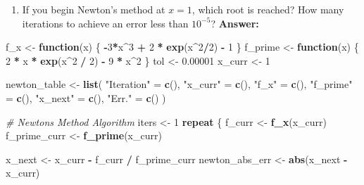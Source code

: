 \documentclass[
]{article}
\newenvironment{Shaded}{\begin{snugshade}}{\end{snugshade}}
\newcommand{\CommentTok}[1]{\textcolor[rgb]{0.56,0.35,0.01}{\textit{#1}}}
\newcommand{\ControlFlowTok}[1]{\textcolor[rgb]{0.13,0.29,0.53}{\textbf{#1}}}
\newcommand{\DecValTok}[1]{\textcolor[rgb]{0.00,0.00,0.81}{#1}}
\newcommand{\FloatTok}[1]{\textcolor[rgb]{0.00,0.00,0.81}{#1}}
\newcommand{\FunctionTok}[1]{\textcolor[rgb]{0.13,0.29,0.53}{\textbf{#1}}}
\newcommand{\NormalTok}[1]{#1}
\newcommand{\OtherTok}[1]{\textcolor[rgb]{0.56,0.35,0.01}{#1}}
\newcommand{\SpecialCharTok}[1]{\textcolor[rgb]{0.81,0.36,0.00}{\textbf{#1}}}
\newcommand{\StringTok}[1]{\textcolor[rgb]{0.31,0.60,0.02}{#1}}
\providecommand{\tightlist}{%
  \setlength{\itemsep}{0pt}\setlength{\parskip}{0pt}}
\begin{document}
\begin{enumerate}
\def\labelenumi{\alph{enumi}.}
\setcounter{enumi}{1}
\tightlist
\item
  If you begin Newton's method at \(x = 1\), which root is reached? How
  many iterations to achieve an error less than \(10^{-5}\)?
  \textbf{Answer:}
\end{enumerate}

\begin{Shaded}
\begin{Highlighting}[]
\NormalTok{f\_x }\OtherTok{\textless{}{-}} \ControlFlowTok{function}\NormalTok{(x) \{ }\SpecialCharTok{{-}}\DecValTok{3}\SpecialCharTok{*}\NormalTok{x}\SpecialCharTok{\^{}}\DecValTok{3} \SpecialCharTok{+} \DecValTok{2} \SpecialCharTok{*} \FunctionTok{exp}\NormalTok{(x}\SpecialCharTok{\^{}}\DecValTok{2}\SpecialCharTok{/}\DecValTok{2}\NormalTok{) }\SpecialCharTok{{-}} \DecValTok{1}\NormalTok{ \}}
\NormalTok{f\_prime }\OtherTok{\textless{}{-}} \ControlFlowTok{function}\NormalTok{(x) \{ }\DecValTok{2} \SpecialCharTok{*}\NormalTok{ x }\SpecialCharTok{*} \FunctionTok{exp}\NormalTok{(x}\SpecialCharTok{\^{}}\DecValTok{2} \SpecialCharTok{/} \DecValTok{2}\NormalTok{) }\SpecialCharTok{{-}} \DecValTok{9} \SpecialCharTok{*}\NormalTok{ x}\SpecialCharTok{\^{}}\DecValTok{2}\NormalTok{ \}}
\NormalTok{tol }\OtherTok{\textless{}{-}} \FloatTok{0.00001}
\NormalTok{x\_curr }\OtherTok{\textless{}{-}} \DecValTok{1}

\NormalTok{newton\_table }\OtherTok{\textless{}{-}} \FunctionTok{list}\NormalTok{(}
  \StringTok{"Iteration"} \OtherTok{=} \FunctionTok{c}\NormalTok{(),}
  \StringTok{"x\_curr"} \OtherTok{=} \FunctionTok{c}\NormalTok{(),}
  \StringTok{"f\_x"} \OtherTok{=} \FunctionTok{c}\NormalTok{(),}
  \StringTok{"f\_prime"} \OtherTok{=} \FunctionTok{c}\NormalTok{(),}
  \StringTok{"x\_next"} \OtherTok{=} \FunctionTok{c}\NormalTok{(),}
  \StringTok{"Err."} \OtherTok{=} \FunctionTok{c}\NormalTok{()}
\NormalTok{)}

\CommentTok{\# Newton\textquotesingle{}s Method Algorithm}
\NormalTok{iters }\OtherTok{\textless{}{-}} \DecValTok{1}
\ControlFlowTok{repeat}\NormalTok{ \{}
\NormalTok{  f\_curr }\OtherTok{\textless{}{-}} \FunctionTok{f\_x}\NormalTok{(x\_curr)}
\NormalTok{  f\_prime\_curr }\OtherTok{\textless{}{-}} \FunctionTok{f\_prime}\NormalTok{(x\_curr)}
  
\NormalTok{  x\_next }\OtherTok{\textless{}{-}}\NormalTok{ x\_curr }\SpecialCharTok{{-}}\NormalTok{ f\_curr }\SpecialCharTok{/}\NormalTok{ f\_prime\_curr}
\NormalTok{  newton\_abs\_err }\OtherTok{\textless{}{-}} \FunctionTok{abs}\NormalTok{(x\_next }\SpecialCharTok{{-}}\NormalTok{ x\_curr)}
  

\end{Highlighting}
\end{Shaded}
\end{document}
